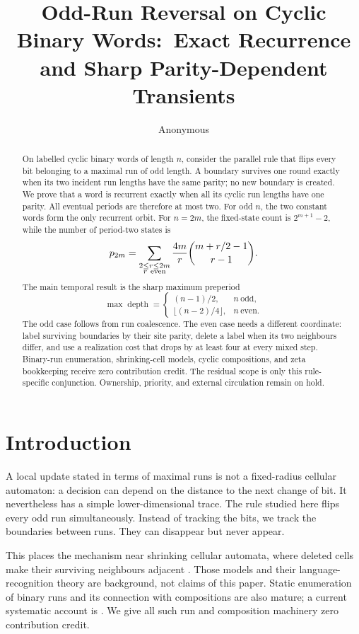\documentclass[11pt,a4paper]{amsart}
\title[Odd-run reversal]{Odd-Run Reversal on Cyclic Binary Words:\
Exact Recurrence and Sharp Parity-Dependent Transients}
\author{Anonymous}
\date{}
\theoremstyle{definition}
\theoremstyle{remark}
\newcommand{\depth}{\operatorname{depth}}
\begin{document}
\begin{abstract}
On labelled cyclic binary words of length \(n\), consider the parallel rule
that flips every bit belonging to a maximal run of odd length.  A boundary
survives one round exactly when its two incident run lengths have the same
parity; no new boundary is created.  We prove that a word is recurrent
exactly when all its cyclic run lengths have one parity.  All eventual
periods are therefore at most two.  For odd \(n\), the two constant words
form the only recurrent orbit.  For \(n=2m\), the fixed-state count is
\(2^{m+1}-2\), while the number of period-two states is
\[
 p_{2m}=\sum_{\substack{2\le r\le2m\\r\ {\rm even}}}
 \frac{4m}{r}\binom{m+r/2-1}{r-1}.
\]
The main temporal result is the sharp maximum preperiod
\[
 \max\depth=
 \begin{cases}
 (n-1)/2,&n\ \text{odd},\\
 \lfloor(n-2)/4\rfloor,&n\ \text{even}.
 \end{cases}
\]
The odd case follows from run coalescence.  The even case needs a different
coordinate: label surviving boundaries by their site parity, delete a label
when its two neighbours differ, and use a realization cost that drops by at
least four at every mixed step.  Binary-run enumeration, shrinking-cell
models, cyclic compositions, and zeta bookkeeping receive zero contribution
credit.  The residual scope is only this rule-specific conjunction.
Ownership, priority, and external circulation remain on hold.
\end{abstract}

\maketitle

\section{Introduction}

A local update stated in terms of maximal runs is not a fixed-radius cellular
automaton: a decision can depend on the distance to the next change of bit.
It nevertheless has a simple lower-dimensional trace.  The rule studied here
flips every odd run simultaneously.  Instead of tracking the bits, we track
the boundaries between runs.  They can disappear but never appear.

This places the mechanism near shrinking cellular automata, where deleted
cells make their surviving neighbours adjacent
\cite{RosenfeldWuDubitzki1983,ModaneseWorsch2016,KutribMalcherWendlandt2017}.
Those models and their language-recognition theory are background, not claims
of this paper.  Static enumeration of binary runs and its connection with
compositions are also mature; a current systematic account is
\cite{BaladoSilvestre2026}.  We give all such run and composition machinery
zero contribution credit.
\end{document}

